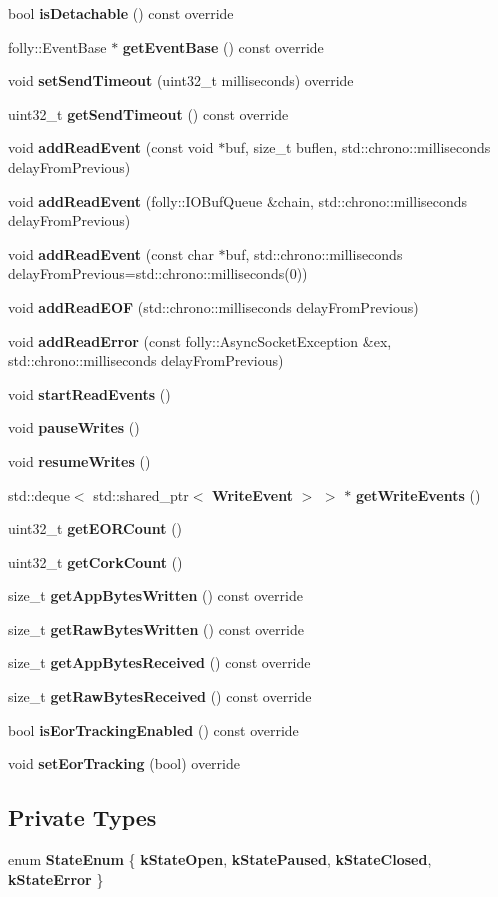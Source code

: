 \begin{DoxyCompactItemize}
bool {\bf is\+Detachable} () const override
\item 
folly\+::\+Event\+Base $\ast$ {\bf get\+Event\+Base} () const override
\item 
void {\bf set\+Send\+Timeout} (uint32\+\_\+t milliseconds) override
\item 
uint32\+\_\+t {\bf get\+Send\+Timeout} () const override
\item 
void {\bf add\+Read\+Event} (const void $\ast$buf, size\+\_\+t buflen, std\+::chrono\+::milliseconds delay\+From\+Previous)
\item 
void {\bf add\+Read\+Event} (folly\+::\+I\+O\+Buf\+Queue \&chain, std\+::chrono\+::milliseconds delay\+From\+Previous)
\item 
void {\bf add\+Read\+Event} (const char $\ast$buf, std\+::chrono\+::milliseconds delay\+From\+Previous=std\+::chrono\+::milliseconds(0))
\item 
void {\bf add\+Read\+E\+OF} (std\+::chrono\+::milliseconds delay\+From\+Previous)
\item 
void {\bf add\+Read\+Error} (const folly\+::\+Async\+Socket\+Exception \&ex, std\+::chrono\+::milliseconds delay\+From\+Previous)
\item 
void {\bf start\+Read\+Events} ()
\item 
void {\bf pause\+Writes} ()
\item 
void {\bf resume\+Writes} ()
\item 
std\+::deque$<$ std\+::shared\+\_\+ptr$<$ {\bf Write\+Event} $>$ $>$ $\ast$ {\bf get\+Write\+Events} ()
\item 
uint32\+\_\+t {\bf get\+E\+O\+R\+Count} ()
\item 
uint32\+\_\+t {\bf get\+Cork\+Count} ()
\item 
size\+\_\+t {\bf get\+App\+Bytes\+Written} () const override
\item 
size\+\_\+t {\bf get\+Raw\+Bytes\+Written} () const override
\item 
size\+\_\+t {\bf get\+App\+Bytes\+Received} () const override
\item 
size\+\_\+t {\bf get\+Raw\+Bytes\+Received} () const override
\item 
bool {\bf is\+Eor\+Tracking\+Enabled} () const override
\item 
void {\bf set\+Eor\+Tracking} (bool) override
\end{DoxyCompactItemize}
\subsection*{Private Types}
\begin{DoxyCompactItemize}
\item 
enum {\bf State\+Enum} \{ {\bf k\+State\+Open}, 
{\bf k\+State\+Paused}, 
{\bf k\+State\+Closed}, 
{\bf k\+State\+Error}
 \}
\end{DoxyCompactItemize}
